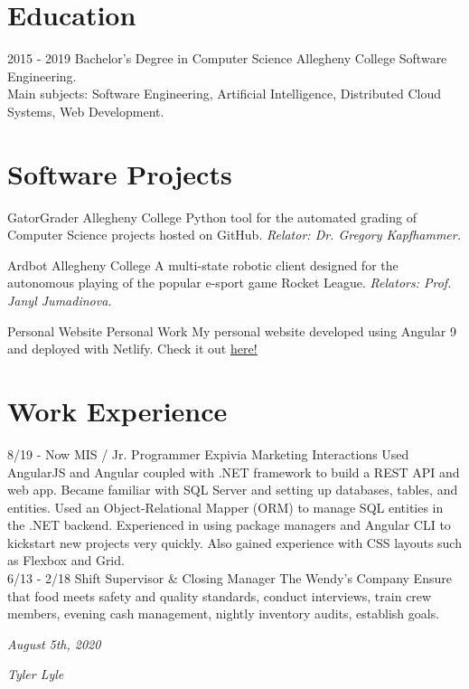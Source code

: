 \documentclass[]{friggeri-cv}
\begin{document}
\section{Education}
\begin{entrylist}
	\entry
	{2015 - 2019}
	{Bachelor's Degree in Computer Science}
	{Allegheny College}
	{Software Engineering.\\
		Main subjects: Software Engineering, Artificial Intelligence, Distributed Cloud Systems, Web Development.\\
	}

\end{entrylist}

\section{Software Projects}
\begin{entrylist}
	\entry
	{}
	{GatorGrader}
	{Allegheny College}
	{Python tool for the automated grading of Computer Science projects hosted on GitHub. \emph{Relator: Dr. Gregory Kapfhammer.}\\}
	
	\entry
	{}
	{Ardbot}
	{Allegheny College}
	{A multi-state robotic client designed for the autonomous playing of the popular e-sport game Rocket League. \emph{Relators: Prof. Janyl Jumadinova.}\\}
	
	\entry
	{}
	{Personal Website}
	{Personal Work}
	{My personal website developed using Angular 9 and deployed with Netlify. Check it out \underline{\href{https://tyler-lyle.netlify.com/}{here!}}\\}
	
\end{entrylist}

\section{Work Experience}
\begin{entrylist}
  \entry
    {8/19 - Now}
    {MIS / Jr. Programmer}
    {Expivia Marketing Interactions}
    {Used AngularJS and Angular coupled with .NET framework to build a REST API and web app.  Became familiar with SQL Server and setting up databases, tables, and entities.  Used an Object-Relational Mapper (ORM) to manage SQL entities in the .NET backend.  Experienced in using package managers and Angular CLI to kickstart new projects very quickly. Also gained experience with CSS layouts such as Flexbox and Grid.\\}
  \entry
    {6/13 - 2/18}
    {Shift Supervisor \& Closing Manager}
    {The Wendy's Company}
    {Ensure that food meets safety and quality standards, conduct interviews, train crew members, evening cash management, nightly inventory audits, establish goals.\\}
\end{entrylist}

\begin{flushleft}
\emph{August 5th, 2020}
\end{flushleft}
\begin{flushright}
\emph{Tyler Lyle}
\end{flushright}
\end{document}
